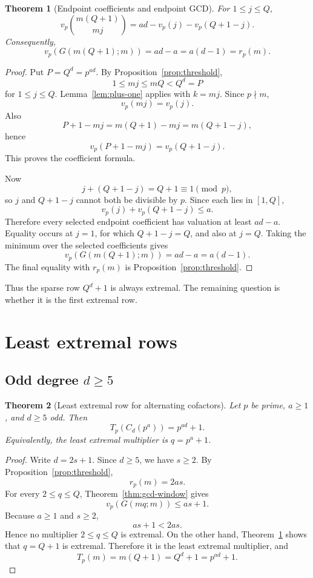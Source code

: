 \documentclass[11pt]{article}
\newtheorem{theorem}{Theorem}[section]
\theoremstyle{definition}
\theoremstyle{remark}
\begin{document}
\begin{theorem}[Endpoint coefficients and endpoint GCD]
\label{thm:endpoint}
For \(1\le j\le Q\),
\[
  v_p\binom{m(Q+1)}{mj}
  =
  ad-v_p(j)-v_p(Q+1-j).
\]
Consequently,
\[
  v_p(G(m(Q+1);m))
  =
  ad-a
  =
  a(d-1)
  =
  r_p(m).
\]
\end{theorem}

\begin{proof}
Put \(P=Q^d=p^{ad}\).  By Proposition~\ref{prop:threshold},
\[
  1\le mj\le mQ<Q^d=P
\]
for \(1\le j\le Q\).  Lemma~\ref{lem:plus-one} applies with \(k=mj\).
Since \(p\nmid m\),
\[
  v_p(mj)=v_p(j).
\]
Also
\[
  P+1-mj
  =
  m(Q+1)-mj
  =
  m(Q+1-j),
\]
hence
\[
  v_p(P+1-mj)=v_p(Q+1-j).
\]
This proves the coefficient formula.

Now
\[
  j+(Q+1-j)=Q+1\equiv1\pmod p,
\]
so \(j\) and \(Q+1-j\) cannot both be divisible by \(p\).  Since each lies in
\([1,Q]\),
\[
  v_p(j)+v_p(Q+1-j)\le a.
\]
Therefore every selected endpoint coefficient has valuation at least
\(ad-a\).  Equality occurs at \(j=1\), for which \(Q+1-j=Q\), and also at
\(j=Q\).  Taking the minimum over the selected coefficients gives
\[
  v_p(G(m(Q+1);m))=ad-a=a(d-1).
\]
The final equality with \(r_p(m)\) is Proposition~\ref{prop:threshold}.
\end{proof}

Thus the sparse row \(Q^d+1\) is always extremal.  The remaining question is
whether it is the first extremal row.

\section{Least extremal rows}\label{sec:least}

\subsection{\texorpdfstring{Odd degree \(d\ge5\)}{Odd degree d >= 5}}

\begin{theorem}[Least extremal row for alternating cofactors]
\label{thm:mainA}
Let \(p\) be prime, \(a\ge1\), and \(d\ge5\) odd.  Then
\[
  T_p(C_d(p^a))=p^{ad}+1.
\]
Equivalently, the least extremal multiplier is \(q=p^a+1\).
\end{theorem}

\begin{proof}
Write \(d=2s+1\).  Since \(d\ge5\), we have \(s\ge2\).  By
Proposition~\ref{prop:threshold},
\[
  r_p(m)=2as.
\]
For every \(2\le q\le Q\), Theorem~\ref{thm:gcd-window} gives
\[
  v_p(G(mq;m))\le as+1.
\]
Because \(a\ge1\) and \(s\ge2\),
\[
  as+1<2as.
\]
Hence no multiplier \(2\le q\le Q\) is extremal.  On the other hand,
Theorem~\ref{thm:endpoint} shows that \(q=Q+1\) is extremal.  Therefore it is
the least extremal multiplier, and
\[
  T_p(m)=m(Q+1)=Q^d+1=p^{ad}+1.
\]
\end{proof}
\end{document}
